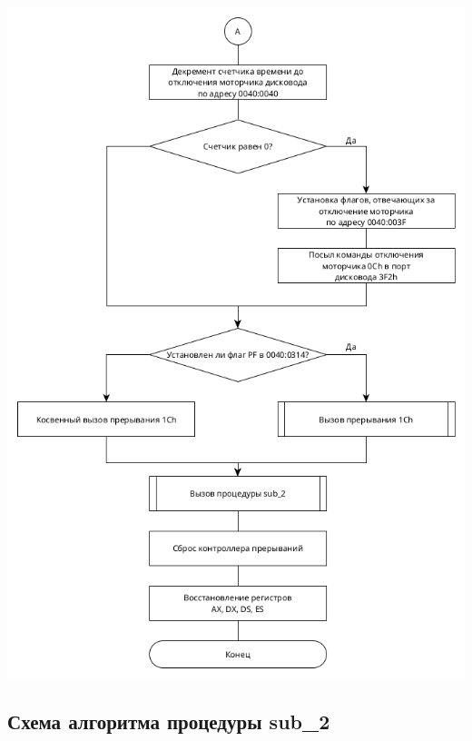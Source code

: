 \documentclass[14pt, a4paper]{article}
\begin{document}
	\begin{minipage}{0.9\linewidth}
		\includegraphics[width=\linewidth]{diagram1_2}
	\end{minipage}

	\pagebreak
	
	\subsection*{Схема алгоритма процедуры sub\_2}
	
	\bigbreak
	
\end{document}
